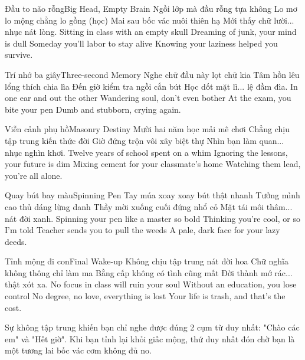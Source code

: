 \begin{tutuyetbox}{Đầu to não rỗng}{Big Head, Empty Brain}
Ngồi lớp mà đầu rỗng tựa không
Lo mơ lo mộng chẳng lo gồng (học)
Mai sau bốc vác nuôi thiên hạ
Mới thấy chữ lười... nhục nát lòng.
\tcblower
Sitting in class with an empty skull
Dreaming of junk, your mind is dull
Someday you'll labor to stay alive
Knowing your laziness helped you survive.
\end{tutuyetbox}

\begin{tutuyetbox}{Trí nhớ ba giây}{Three-second Memory}
Nghe chữ đầu này lọt chữ kia
Tâm hồn lêu lổng thích chia lìa
Đến giờ kiểm tra ngồi cắn bút
Học dốt mặt lì... lệ đầm đìa.
\tcblower
In one ear and out the other
Wandering soul, don't even bother
At the exam, you bite your pen
Dumb and stubborn, crying again.
\end{tutuyetbox}

\begin{tutuyetbox}{Viễn cảnh phụ hồ}{Masonry Destiny}
Mười hai năm học mải mê chơi
Chẳng chịu tập trung kiến thức đời
Giờ đứng trộn vôi xây biệt thự
Nhìn bạn làm quan... nhục nghìn khơi.
\tcblower
Twelve years of school spent on a whim
Ignoring the lessons, your future is dim
Mixing cement for your classmate's home
Watching them lead, you're all alone.
\end{tutuyetbox}

\begin{tutuyetbox}{Quay bút bay màu}{Spinning Pen}
Tay múa xoay xoay bút thật nhanh
Tưởng mình cao thủ dáng lừng danh
Thầy mời xuống cuối đứng nhổ cỏ
Mặt tái môi thâm... nát đời xanh.
\tcblower
Spinning your pen like a master so bold
Thinking you're cool, or so I'm told
Teacher sends you to pull the weeds
A pale, dark face for your lazy deeds.
\end{tutuyetbox}

\begin{tutuyetbox}{Tỉnh mộng đi con}{Final Wake-up}
Không chịu tập trung nát đời hoa
Chữ nghĩa không thông chỉ làm ma
Bằng cấp không có tình cũng mất
Đời thành mớ rác... thật xót xa.
\tcblower
No focus in class will ruin your soul
Without an education, you lose control
No degree, no love, everything is lost
Your life is trash, and that's the cost.
\end{tutuyetbox}

\begin{ghichu}
Sự không tập trung khiến bạn chỉ nghe được đúng 2 cụm từ duy nhất: "Chào các em" và "Hết giờ". Khi bạn tỉnh lại khỏi giấc mộng, thứ duy nhất đón chờ bạn là một tương lai bốc vác cơm không đủ no.
\end{ghichu}